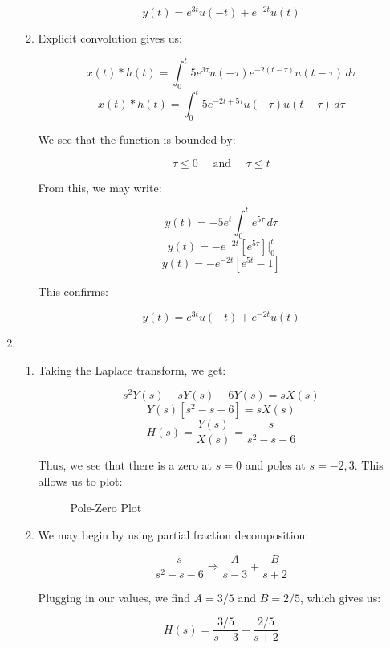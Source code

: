 \begin{enumerate}
\begin{enumerate}
        $$\boxed{y(t)=e^{3t}u(-t)+e^{-2t}u(t)}$$

      \item 

        Explicit convolution gives us:

        $$x(t)*h(t)=\int_0^t 5e^{3\tau}u(-\tau)e^{-2(t-\tau)}u(t-\tau)\,d\tau$$
        $$x(t)*h(t)=\int_0^t 5e^{-2t+5\tau}u(-\tau)u(t-\tau)\,d\tau$$

        We see that the function is bounded by:

        $$\tau \leq 0\quad\text{ and }\quad \tau\leq t$$

        From this, we may write:

        $$y(t)=-5e^t\int_0^t e^{5\tau}\,d\tau$$
        $$y(t)=-e^{-2t}\left[ e^{5\tau} \right]\Big|_0^t$$
        $$y(t)=-e^{-2t}\left[ e^{5t}-1 \right]$$

        This confirms:

        $$\boxed{y(t)=e^{3t}u(-t)+e^{-2t}u(t)}$$

    \end{enumerate}

  \item

    \begin{enumerate}

      \item 

        Taking the Laplace transform, we get:

        $$s^2Y(s)-sY(s)-6Y(s)=sX(s)$$
        $$Y(s)[s^2-s-6]=sX(s)$$
        $$\boxed{H(s)=\frac{Y(s)}{X(s)}=\frac{s}{s^2-s-6}}$$

        Thus, we see that there is a zero at $s=0$ and poles at $s=-2,3$. This allows us to plot:

        \begin{figure}[H]
          \centering
          
          \caption{Pole-Zero Plot}
          \label{fig:1}
        \end{figure}
        
      \item 

        We may begin by using partial fraction decomposition:

        $$\frac{s}{s^2-s-6}\Rightarrow \frac{A}{s-3}+\frac{B}{s+2}$$

        Plugging in our values, we find $A=3/5$ and $B=2/5$, which gives us:

        $$H(s)=\frac{3/5}{s-3}+\frac{2/5}{s+2}$$


\end{enumerate}
\end{enumerate}
